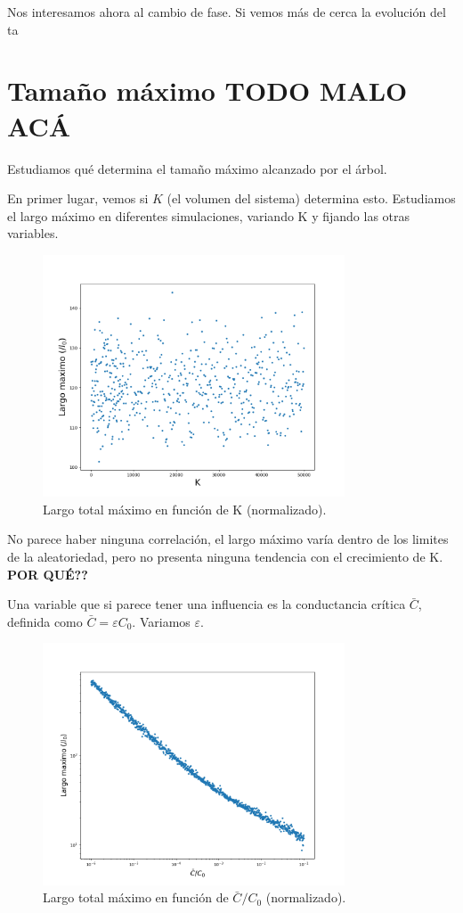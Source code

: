 \documentclass{article}
\begin{document}
Nos interesamos ahora al cambio de fase. Si vemos más de cerca la evolución del ta

\section{Tamaño máximo \textbf{TODO MALO ACÁ}}

Estudiamos qué determina el tamaño máximo alcanzado por el árbol.

En primer lugar, vemos si $K$ (el volumen del sistema) determina esto. Estudiamos el largo máximo en diferentes simulaciones, variando K y 
fijando las otras variables.

\begin{figure}[h!]
    \centering
    \includegraphics[width=0.8\textwidth]{graficos_inst/lmax_vs_K.png}
    \caption{Largo total máximo en función de K (normalizado).}
    \label{fig:lmax_vs_K}
\end{figure}

No parece haber ninguna correlación, el largo máximo varía dentro de los limites de la aleatoriedad, pero no presenta ninguna tendencia con
el crecimiento de K. \textbf{POR QUÉ??}

Una variable que si parece tener una influencia es la conductancia crítica $\bar{C}$, definida como $\bar{C} = \varepsilon C_0$. Variamos $\varepsilon$. 

\begin{figure}[h!]
    \centering
    \includegraphics[width=0.8\textwidth]{graficos_inst/lmax_vs_epsilon.png}
    \caption{Largo total máximo en función de $\bar{C}/C_0$ (normalizado).}
    \label{fig:lmax_vs_epsilon}
\end{figure}
\end{document}
